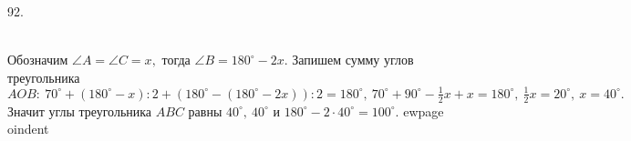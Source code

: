 92. \begin{figure}[ht!]
\end{figure}\\
Обозначим $\angle A=\angle C=x,$ тогда $\angle B=180^\circ-2x.$ Запишем сумму углов треугольника $AOB:\ 70^\circ+(180^\circ-x):2+(180^\circ-(180^\circ-2x)):2=180^\circ,\ 70^\circ +90^\circ-\frac{1}{2}x+x=180^\circ,\ \frac{1}{2}x=20^\circ,\ x=40^\circ.$ Значит углы треугольника $ABC$ равны $40^\circ,\ 40^\circ$ и $180^\circ-2\cdot40^\circ=100^\circ.$
ewpage
oindent
